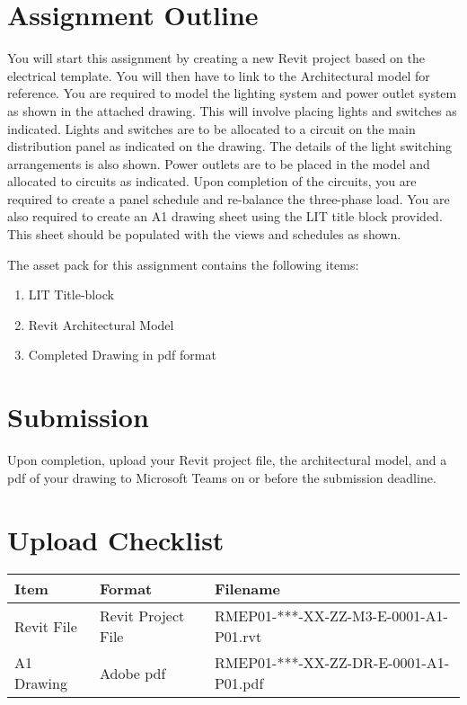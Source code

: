 \vspace{1cm}

\section*{Assignment Outline}
You will start this assignment by creating a new Revit project based on the electrical template. You will then have to link to the Architectural model for reference.
You are required to model the lighting system and power outlet system as shown in the attached drawing. This will involve placing lights and switches as indicated. Lights and switches are to be allocated to a circuit on the main distribution panel as indicated on the drawing. The details of the light switching arrangements is also shown.
Power outlets are to be placed in the model and allocated to circuits as indicated.
Upon completion of the circuits, you are required to create a panel schedule and re-balance the three-phase load.
You are also required to create an A1 drawing sheet using the LIT title block provided. This sheet should be populated with the views and schedules as shown.

The asset pack for this assignment contains the following items:
\begin{enumerate}
	\item LIT Title-block
	\item Revit Architectural Model
	\item Completed Drawing in pdf format
\end{enumerate}


\section*{Submission}
Upon completion, upload your Revit project file, the architectural model, and a pdf of your drawing to Microsoft Teams on or before the submission deadline.


\section*{Upload Checklist}

\begin{tabular}{|l|l|l|}
	\hline
	\textbf{Item} & \textbf{Format} & \textbf{Filename} \\
	\hline
	Revit File  & Revit Project File & RMEP01-***-XX-ZZ-M3-E-0001-A1-P01.rvt  \\
	A1 Drawing  & Adobe pdf & RMEP01-***-XX-ZZ-DR-E-0001-A1-P01.pdf  \\
	\hline
\end{tabular}


